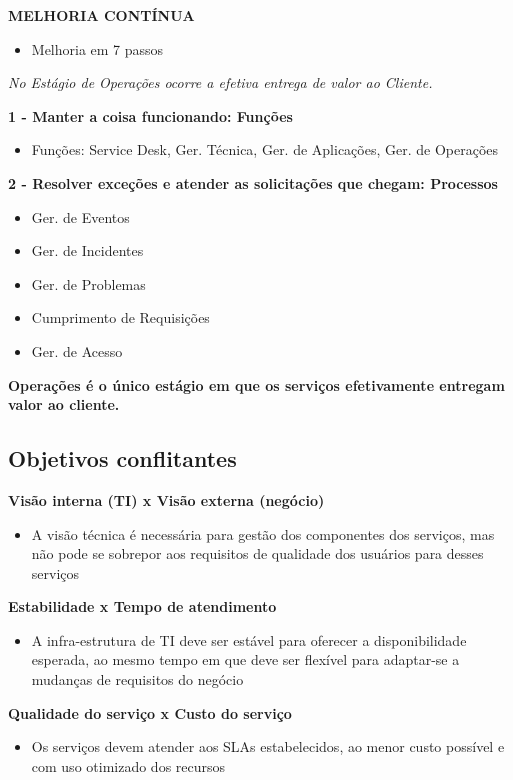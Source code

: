 \textbf{MELHORIA CONTÍNUA}
\begin{itemize}
	\item Melhoria em 7 passos
\end{itemize}

\begin{center}
	\emph{No Estágio de Operações ocorre a efetiva entrega de valor ao Cliente.}
\end{center}

\textbf{1 - Manter a coisa funcionando: Funções}
\begin{itemize}
	\item Funções: Service Desk, Ger. Técnica, Ger. de Aplicações, Ger. de Operações
\end{itemize}


\textbf{2 - Resolver exceções e atender as solicitações que chegam: Processos}
\begin{itemize}
	\item Ger. de Eventos
	\item Ger. de Incidentes
	\item Ger. de Problemas
	\item Cumprimento de Requisições
	\item Ger. de Acesso
\end{itemize}

\textbf{Operações é o único estágio em que os serviços efetivamente entregam valor ao cliente.}

\subsection{Objetivos conflitantes}

\textbf{Visão interna (TI) x Visão externa (negócio)}
\begin{itemize}
	\item A visão técnica é necessária para gestão dos componentes dos serviços, mas não pode se sobrepor aos requisitos de qualidade dos usuários para desses serviços
\end{itemize}

\textbf{Estabilidade x Tempo de atendimento}
\begin{itemize}
	\item A infra-estrutura de TI deve ser estável para oferecer a disponibilidade esperada, ao mesmo tempo em que deve ser flexível para adaptar-se a mudanças de requisitos do negócio
\end{itemize}

\textbf{Qualidade do serviço x Custo do serviço}
\begin{itemize}
	\item Os serviços devem atender aos SLAs estabelecidos, ao menor custo possível e com uso otimizado dos recursos
\end{itemize}

